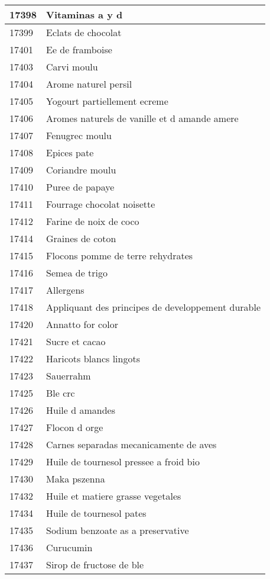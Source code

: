 \begin{longtable}{|l|l|}
17398 & Vitaminas a y d \\ \hline 
17399 & Eclats de chocolat \\ \hline 
17401 & Ee de framboise \\ \hline 
17403 & Carvi moulu \\ \hline 
17404 & Arome naturel persil \\ \hline 
17405 & Yogourt partiellement ecreme \\ \hline 
17406 & Aromes naturels de vanille et d amande amere \\ \hline 
17407 & Fenugrec moulu \\ \hline 
17408 & Epices pate \\ \hline 
17409 & Coriandre moulu \\ \hline 
17410 & Puree de papaye \\ \hline 
17411 & Fourrage chocolat noisette \\ \hline 
17412 & Farine de noix de coco \\ \hline 
17414 & Graines de coton \\ \hline 
17415 & Flocons pomme de terre rehydrates \\ \hline 
17416 & Semea de trigo \\ \hline 
17417 & Allergens \\ \hline 
17418 & Appliquant des principes de developpement durable \\ \hline 
17420 & Annatto for color \\ \hline 
17421 & Sucre et cacao \\ \hline 
17422 & Haricots blancs lingots \\ \hline 
17423 & Sauerrahm \\ \hline 
17425 & Ble crc \\ \hline 
17426 & Huile d amandes \\ \hline 
17427 & Flocon d orge \\ \hline 
17428 & Carnes separadas mecanicamente de aves \\ \hline 
17429 & Huile de tournesol pressee a froid bio \\ \hline 
17430 & Maka pszenna \\ \hline 
17432 & Huile et matiere grasse vegetales \\ \hline 
17434 & Huile de tournesol pates \\ \hline 
17435 & Sodium benzoate as a preservative \\ \hline 
17436 & Curucumin \\ \hline 
17437 & Sirop de fructose de ble \\ \hline 

\end{longtable}
